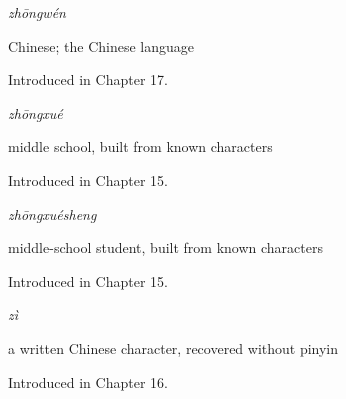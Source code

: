 \noindent\begin{minipage}[t]{\linewidth}
\raggedright
\textbf{}\enspace\emph{zhōngwén}\par
\small Chinese; the Chinese language\par
\footnotesize Introduced in Chapter 17.
\end{minipage}\par\medskip

\noindent\begin{minipage}[t]{\linewidth}
\raggedright
\textbf{}\enspace\emph{zhōngxué}\par
\small middle school, built from known characters\par
\footnotesize Introduced in Chapter 15.
\end{minipage}\par\medskip

\noindent\begin{minipage}[t]{\linewidth}
\raggedright
\textbf{}\enspace\emph{zhōngxuésheng}\par
\small middle-school student, built from known characters\par
\footnotesize Introduced in Chapter 15.
\end{minipage}\par\medskip

\noindent\begin{minipage}[t]{\linewidth}
\raggedright
\textbf{}\enspace\emph{zì}\par
\small a written Chinese character, recovered without pinyin\par
\footnotesize Introduced in Chapter 16.
\end{minipage}\par\medskip
